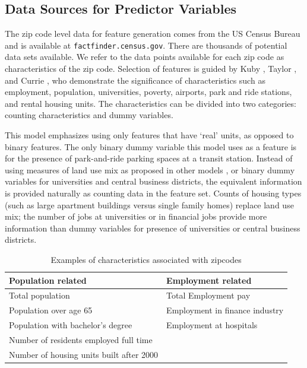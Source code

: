 \documentclass[11pt]{article}
\begin{document}
\subsection{Data Sources for Predictor Variables}\label{sec:data}

The zip code level data for feature generation comes from the US Census Bureau and is available at \texttt{factfinder.census.gov}. There are thousands of potential data sets available. We refer to the data points available for each zip code as characteristics of the zip code. Selection of features is guided by Kuby \cite{Kuby2004}, Taylor \cite{Taylor2008}, and Currie \cite{Currie2011}, who demonstrate the significance of characteristics such as employment, population, universities, poverty, airports, park and ride stations, and rental housing units. The characteristics can be divided into two categories: counting characteristics and dummy variables. 

This model emphasizes using only features that have `real' units, as opposed to binary features. The only binary dummy variable this model uses as a feature is for the presence of park-and-ride parking spaces at a transit station. Instead of using measures of land use mix as proposed in other models \cite{Durning2015, Gutierrez2011}, or binary dummy variables for universities and central business districts, the equivalent information is provided naturally as counting data in the feature set. Counts of housing types (such as large apartment buildings versus single family homes) replace land use mix; the number of jobs at universities or in financial jobs provide more information than dummy variables for presence of universities or central business districts. 

\begin{table}[H]
\centering\begingroup\fontsize{10}{10}\selectfont
\begin{tabular}{ll}
\toprule \textbf{Population related}&\textbf{Employment related} \\ 
\midrule Total population&Total Employment pay\\
Population over age 65& Employment in finance industry\\
Population with bachelor's degree& Employment at hospitals\\
Number of residents employed full time&\\
Number of housing units built after 2000&\\
\bottomrule
\end{tabular}\endgroup
\caption{Examples of characteristics associated with zipcodes}\label{tab:char}
\end{table}
\end{document}
